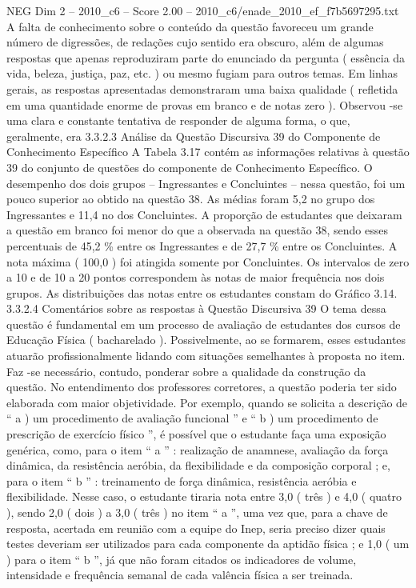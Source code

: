 \begin{textsample}{NEG Dim 2 – 2010\_c6 – Score 2.00 – 2010\_c6/enade\_2010\_ef\_f7b5697295.txt}
A falta de conhecimento sobre o conteúdo da questão favoreceu um grande número de digressões, de redações cujo sentido era obscuro, além de algumas respostas que apenas reproduziram parte do enunciado da pergunta ( essência da vida, beleza, justiça, paz, etc. ) ou mesmo fugiam para outros temas.
Em linhas gerais, as respostas apresentadas demonstraram uma baixa qualidade ( refletida em uma quantidade enorme de provas em branco e de notas zero ).
Observou -se uma clara e constante tentativa de responder de alguma forma, o que, geralmente, era 3.3.2.3 Análise da Questão Discursiva 39 do Componente de Conhecimento Específico A Tabela 3.17 contém as informações relativas à questão 39 do conjunto de questões do componente de Conhecimento Específico.
O desempenho dos dois grupos – Ingressantes e Concluintes – nessa questão, foi um pouco superior ao obtido na questão 38.
As médias foram 5,2 no grupo dos Ingressantes e 11,4 no dos Concluintes.
A proporção de estudantes que deixaram a questão em branco foi menor do que a observada na questão 38, sendo esses percentuais de 45,2 \% entre os Ingressantes e de 27,7 \% entre os Concluintes.
A nota máxima ( 100,0 ) foi atingida somente por Concluintes.
Os intervalos de zero a 10 e de 10 a 20 pontos correspondem às notas de maior frequência nos dois grupos.
As distribuições das notas entre os estudantes constam do Gráfico 3.14. 3.3.2.4 Comentários sobre as respostas à Questão Discursiva 39 O tema dessa questão é fundamental em um processo de avaliação de estudantes dos cursos de Educação Física ( bacharelado ).
Possivelmente, ao se formarem, esses estudantes atuarão profissionalmente lidando com situações semelhantes à proposta no item.
Faz -se necessário, contudo, ponderar sobre a qualidade da construção da questão.
No entendimento dos professores corretores, a questão poderia ter sido elaborada com maior objetividade.
Por exemplo, quando se solicita a descrição de “ a ) um procedimento de avaliação funcional ” e “ b ) um procedimento de prescrição de exercício físico ”, é possível que o estudante faça uma exposição genérica, como, para o item “ a ” : realização de anamnese, avaliação da força dinâmica, da resistência aeróbia, da flexibilidade e da composição corporal ; e, para o item “ b ” : treinamento de força dinâmica, resistência aeróbia e flexibilidade.
Nesse caso, o estudante tiraria nota entre 3,0 ( três ) e 4,0 ( quatro ), sendo 2,0 ( dois ) a 3,0 ( três ) no item “ a ”, uma vez que, para a chave de resposta, acertada em reunião com a equipe do Inep, seria preciso dizer quais testes deveriam ser utilizados para cada componente da aptidão física ; e 1,0 ( um ) para o item “ b ”, já que não foram citados os indicadores de volume, intensidade e frequência semanal de cada valência física a ser treinada.

\end{textsample}
